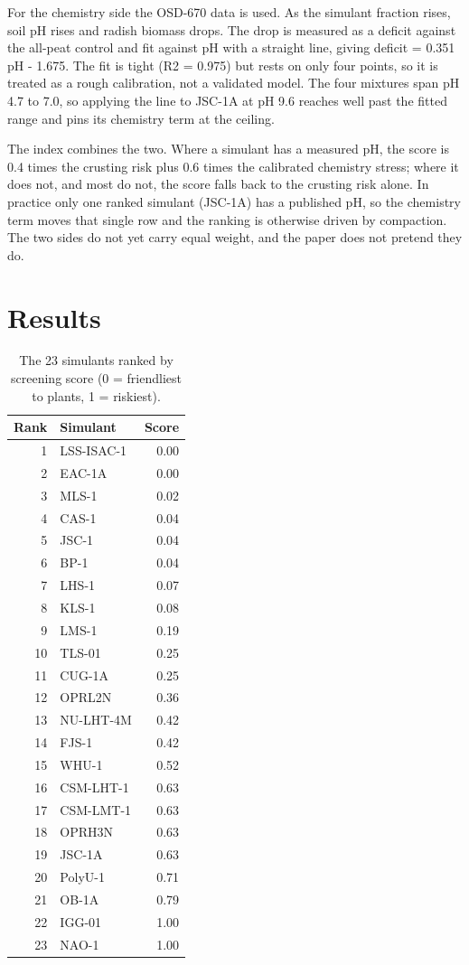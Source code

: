 \documentclass[conference,letterpaper,10pt]{IEEEtran}
\begin{document}
For the chemistry side the OSD-670 data \cite{russell} is used. As the simulant fraction rises, soil pH rises and radish biomass drops. The drop is measured as a deficit against the all-peat control and fit against pH with a straight line, giving deficit = 0.351 pH - 1.675. The fit is tight (R2 = 0.975) but rests on only four points, so it is treated as a rough calibration, not a validated model. The four mixtures span pH 4.7 to 7.0, so applying the line to JSC-1A at pH 9.6 reaches well past the fitted range and pins its chemistry term at the ceiling.

The index combines the two. Where a simulant has a measured pH, the score is 0.4 times the crusting risk plus 0.6 times the calibrated chemistry stress; where it does not, and most do not, the score falls back to the crusting risk alone. In practice only one ranked simulant (JSC-1A) has a published pH, so the chemistry term moves that single row and the ranking is otherwise driven by compaction. The two sides do not yet carry equal weight, and the paper does not pretend they do.

\section{Results}
\begin{table}[t]
\caption{The 23 simulants ranked by screening score (0 = friendliest to plants, 1 = riskiest).}
\label{tab:ranking}
\centering
\begin{tabular}{r l r}
\hline
\textbf{Rank} & \textbf{Simulant} & \textbf{Score} \\ \hline
1 & LSS-ISAC-1 & 0.00 \\
2 & EAC-1A & 0.00 \\
3 & MLS-1 & 0.02 \\
4 & CAS-1 & 0.04 \\
5 & JSC-1 & 0.04 \\
6 & BP-1 & 0.04 \\
7 & LHS-1 & 0.07 \\
8 & KLS-1 & 0.08 \\
9 & LMS-1 & 0.19 \\
10 & TLS-01 & 0.25 \\
11 & CUG-1A & 0.25 \\
12 & OPRL2N & 0.36 \\
13 & NU-LHT-4M & 0.42 \\
14 & FJS-1 & 0.42 \\
15 & WHU-1 & 0.52 \\
16 & CSM-LHT-1 & 0.63 \\
17 & CSM-LMT-1 & 0.63 \\
18 & OPRH3N & 0.63 \\
19 & JSC-1A & 0.63 \\
20 & PolyU-1 & 0.71 \\
21 & OB-1A & 0.79 \\
22 & IGG-01 & 1.00 \\
23 & NAO-1 & 1.00 \\
\hline
\end{tabular}
\end{table}
\end{document}
